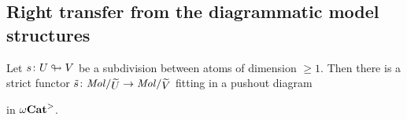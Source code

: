 \subsection{Right transfer from the diagrammatic model structures}

\begin{lem} \label{lem:pushout_with_localisation}
    Let \( s \colon U \looparrowright V \) be a subdivision between atoms of dimension \( \geq 1 \).
    Then there is a strict functor \( \tilde{s} \colon \molecin{\selfloc{U}} \to \molecin{\selfloc V} \) fitting in a pushout diagram
    \begin{center}
    \end{center}
    in \( {\omega\mathbf{Cat}}^> \).
\end{lem}
